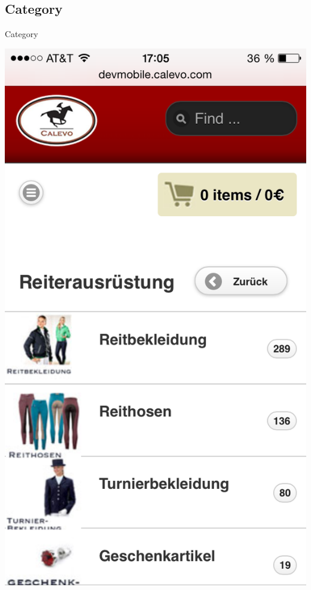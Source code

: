 \subsection{Category}
\begin{frame}{Category}
\begin{center}
  \includegraphics[width=\textwidth,height=1\textheight,keepaspectratio]{pics/category.png}
\end{center}
\end{frame}

